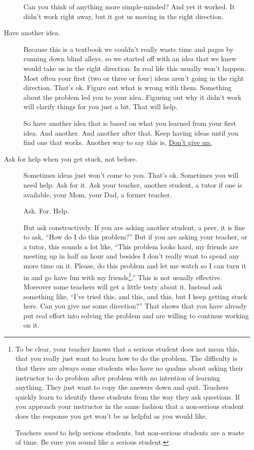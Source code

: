 \begin{description}
    Can you think of anything more simple-minded? And yet it
    worked. It didn't work right away, but it got us moving in the
    right direction.
  \item[Have another idea.] 
    Because this is a textbook we couldn't really waste time and pages
    by running down blind alleys, so we started off with an idea that
    we knew would take us in the right direction. In real life this
    usually won't happen. Most often your first (two or three or four)
    ideas aren't going in the right direction. That's ok. Figure out
    what is wrong with them. Something about the problem led you to
    your idea. Figuring out why it didn't work will clarify things for
    you just a bit. That will help. 

    So have another idea that is based on what you learned from your
    first idea. And another. And another after that. Keep having ideas
    until you find one that works. Another way to say this
    is, \underline{\sc{}Don't give up.}
  \item[Ask for help when you get stuck, not before.] Sometimes ideas
    just won't come to you. That's ok. Sometimes you will need
    help. Ask for it. Ask your teacher, another student, a tutor if
    one is available, your Mom, your Dad, a former teacher.

    Ask. For. Help.

    But ask constructively. If you are asking another student, a peer,
    it is fine to ask, ``How do I do this problem?'' But if you are
    asking your teacher, or a tutor, this sounds a lot like, ``This
    problem looks hard, my friends are meeting up in half an hour and
    besides I don't really want to spend any more time on it. Please,
    do this problem and let me watch so I can turn it in and go have
    fun with my friends\footnote{To be clear, your teacher knows that
      a serious student does not mean this, that you really just want
      to learn how to do the problem. The difficulty is that there are
      always some students who have no qualms about asking their
      instructor to do problem after problem with no intention of
      learning anything. They just want to copy the answers down and
      quit. Teachers quickly learn to identify these students from the
      way they ask questions. If you approach your instructor in the
      same fashion that a non-serious student does the response you
      get won't be as helpful as you would like.

      Teachers \emph{want} to help serious students, but non-serious
      students are a waste of time. Be sure you sound like a serious
      student.}.'' This is not usually effective. Moreover some
    teachers will get a little testy about it. Instead ask something
    like, ``I've tried this, and this, and this, but I keep getting
    stuck here. Can you give me some direction?''  That shows that you
    have already put real effort into solving the problem and are
    willing to continue working on it.


\end{description}
